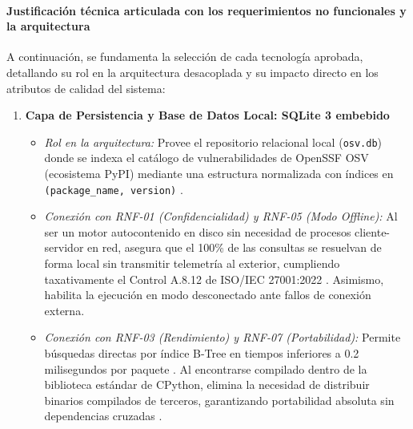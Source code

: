 \paragraph*{Justificación técnica articulada con los requerimientos no funcionales y la arquitectura}
A continuación, se fundamenta la selección de cada tecnología aprobada, detallando su rol en la arquitectura desacoplada y su impacto directo en los atributos de calidad del sistema:

\begin{enumerate}
    \item \textbf{Capa de Persistencia y Base de Datos Local: SQLite 3 embebido}
    \begin{itemize}
        \item \textit{Rol en la arquitectura:} Provee el repositorio relacional local (\texttt{osv.\allowbreak db}) donde se indexa el catálogo de vulnerabilidades de OpenSSF OSV (ecosistema PyPI) mediante una estructura normalizada con índices en \texttt{(package\_\allowbreak name, version)} \cite{openssf2023osv}.
        \item \textit{Conexión con RNF-01 (Confidencialidad) y RNF-05 (Modo Offline):} Al ser un motor autocontenido en disco sin necesidad de procesos cliente-servidor en red, asegura que el 100\% de las consultas se resuelvan de forma local sin transmitir telemetría al exterior, cumpliendo taxativamente el Control A.8.12 de ISO/IEC 27001:2022 \cite{ladisa2023sok, gutierrez2024auditoria}. Asimismo, habilita la ejecución en modo desconectado ante fallos de conexión externa.
        \item \textit{Conexión con RNF-03 (Rendimiento) y RNF-07 (Portabilidad):} Permite búsquedas directas por índice B-Tree en tiempos inferiores a 0.2 milisegundos por paquete \cite{openssf2023osv}. Al encontrarse compilado dentro de la biblioteca estándar de CPython, elimina la necesidad de distribuir binarios compilados de terceros, garantizando portabilidad absoluta sin dependencias cruzadas \cite{pressman2020software}.
    \end{itemize}


\end{enumerate}
